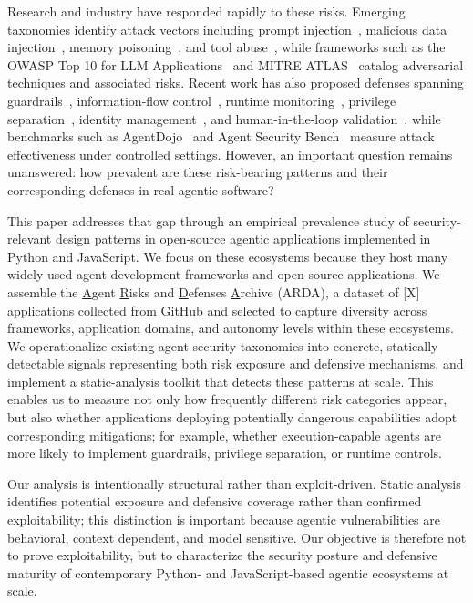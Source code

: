 Research and industry have responded rapidly to these risks. Emerging taxonomies identify attack vectors including prompt injection~\cite{greshake, pleasefix, agentdojo}, malicious data injection~\cite{agent-card-poisoning}, memory poisoning~\cite{memory-poison-sunil}, and tool abuse~\cite{tooltweak}, while frameworks such as the OWASP Top 10 for LLM Applications~\cite{owasp} and MITRE ATLAS~\cite{mitre-atlas} catalog adversarial techniques and associated risks. Recent work has also proposed defenses spanning guardrails~\cite{xiang2024guardagent,pro2guard}, information-flow control~\cite{costa2025fides}, runtime monitoring~\cite{pro2guard}, privilege separation~\cite{progent}, identity management~\cite{openid-identity}, and human-in-the-loop validation~\cite{hula}, while benchmarks such as AgentDojo~\cite{agentdojo} and Agent Security Bench~\cite{asb} measure attack effectiveness under controlled settings. However, an important question remains unanswered: how prevalent are these risk-bearing patterns and their corresponding defenses in real agentic software?



This paper addresses that gap through an empirical prevalence study of security-relevant design patterns in open-source agentic applications implemented in Python and JavaScript. We focus on these ecosystems because they host many widely used agent-development frameworks and open-source applications. We assemble the \underline{A}gent \underline{R}isks and \underline{D}efenses \underline{A}rchive (ARDA), a dataset of [X] applications collected from GitHub and selected to capture diversity across frameworks, application domains, and autonomy levels within these ecosystems. We operationalize existing agent-security taxonomies into concrete, statically detectable signals representing both risk exposure and defensive mechanisms, and implement a static-analysis toolkit that detects these patterns at scale. This enables us to measure not only how frequently different risk categories appear, but also whether applications deploying potentially dangerous capabilities adopt corresponding mitigations; for example, whether execution-capable agents are more likely to implement guardrails, privilege separation, or runtime controls.

Our analysis is intentionally structural rather than exploit-driven. Static analysis identifies potential exposure and defensive coverage rather than confirmed exploitability; this distinction is important because agentic vulnerabilities are behavioral, context dependent, and model sensitive. Our objective is therefore not to prove exploitability, but to characterize the security posture and defensive maturity of contemporary Python- and JavaScript-based agentic ecosystems at scale.

